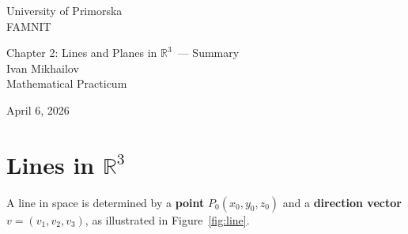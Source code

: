 \documentclass[11pt,a4paper]{article}
\title{}
\author{Ivan Mikhailov}
\theoremstyle{plain}
\theoremstyle{definition}
\theoremstyle{remark}
\newcommand{\R}{\mathbb{R}}
\newcommand{\hwdate}{April 6, 2026}
\newcommand{\rthree}{$\R^3$}
\begin{document}
\thispagestyle{empty}
\begin{flushleft}           
    University of Primorska \\
    FAMNIT
\end{flushleft}

\vspace*{0.2\textheight} 

\begin{center}
    {\LARGE Chapter 2: Lines and Planes in \rthree\  — Summary}\\[1cm]
    {\large Ivan Mikhailov}\\[0.25cm]
    {\large Mathematical Practicum \uppercase\expandafter{}}
\end{center}

\vfill


\begin{flushleft}
    \hwdate
\end{flushleft}

\newpage

\setcounter{page}{1}

\begin{abstract}
This summary presents the core concepts of lines and planes in \rthree.
Lines are described using a point and a direction vector, while planes are defined by a point and a normal vector, each with multiple equivalent representations.
It covers intersections, distances, and angles between lines, planes, and points, providing key formulas for practical computations.
The summary consolidates essential vector-based techniques for analyzing spatial relationships in three-dimensional space.
The material follows \cite{protter} and \cite{algebra1}.
\end{abstract}

\newpage

\tableofcontents
\vspace{1cm}
\listoftables
\vspace{1cm}
\listoffigures

\newpage

\section{Lines in \texorpdfstring{\rthree}{R\textasciicircum 3}}
A line in space is determined by a \textbf{point} $P_0(x_0, y_0, z_0)$
and a \textbf{direction vector} $v = (v_1, v_2, v_3)$, as illustrated in Figure~\ref{fig:line}.
\end{document}
